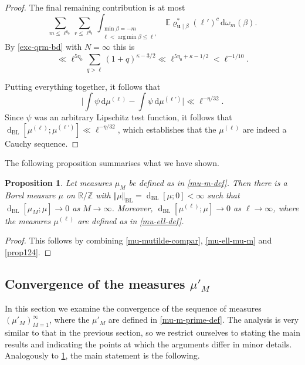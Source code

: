 \documentclass[11pt,reqno]{amsart}
\DeclareMathOperator*{\argmin}{arg\,min}
\numberwithin{equation}{section}
\newtheorem{proposition}[theorem]{Proposition}
\theoremstyle{definition}
\theoremstyle{remark}
\newcommand{\mb}{\mathbb}
\newcommand{\mbf}{\mathbf}
\newcommand{\dist}[2]{{\operatorname{d}_{\operatorname{BL}}[#1;#2]}}
\def\BL{\operatorname{BL}}
\renewcommand{\le}{\leqslant}
\newcommand\Z{\mathbb{Z}}
\newcommand\R{\mathbb{R}}
\begin{document}
\begin{proof}
The final remaining contribution is at most
\[ \sum_{m \le \ell^{\eta_0}} \sum_{r \le \ell^{\eta_0}} \int_{\substack{\min \beta = -m \\ \ell < \argmin \beta \le \ell'}} \mb{E} \varrho^*_{\mbf{u} \mid \beta}(\ell')^c \, \mathrm{d}\omega_{m} (\beta).\] By \cref{exc-qrm-bd} with $N = \infty$ this is
\[ \ll \ell^{5\eta_0} \sum_{q > \ell} (1 + q)^{\kappa - 3/2} \ll \ell^{5\eta_0 + \kappa - 1/2} < \ell^{-1/10}.\]


Putting everything together, it follows that 
\[ \big| \int \psi \, \mathrm{d}\mu^{(\ell)} - \int \psi \, \mathrm{d}\mu^{(\ell')} \big| \ll \ell^{-\eta/32}.\] Since $\psi$ was an arbitrary Lipschitz test function, it follows that $\dist{\mu^{(\ell)}}{\mu^{(\ell')}} \ll \ell^{-\eta/32}$, which establishes that the $\mu^{(\ell)}$ are indeed a Cauchy sequence.
\end{proof}

The following proposition summarises what we have shown. 

\begin{proposition}\label{main-mu-conv-prop} 
Let measures $\mu_M$ be defined as in \cref{mu-m-def}. Then there is a Borel measure $\mu$ on $\R/\Z$ with $\Vert \mu \Vert_{\BL} = \dist{\mu}{0} < \infty$ such that $\dist{\mu_M}{\mu} \rightarrow 0$ as $M \rightarrow \infty$. Moreover, $\dist{\mu^{(\ell)}}{\mu} \rightarrow 0$ as $\ell \rightarrow \infty$, where the measures $\mu^{(\ell)}$ are defined as in \cref{mu-ell-def}.
\end{proposition}
\begin{proof}
This follows by combining \cref{mu-mutilde-compar}, \cref{mu-ell-mu-m} and \cref{prop124}.
\end{proof}


\subsection{Convergence of the measures $\mu'_M$}
In this section we examine the convergence of the sequence of measures $(\mu'_M)_{M = 1}^{\infty}$, where the $\mu'_M$ are defined in \cref{mu-m-prime-def}. The analysis is very similar to that in the previous section, so we restrict ourselves to stating the main results and indicating the points at which the arguments differ in minor details. Analogously to \cref{main-mu-conv-prop}, the main statement is the following.
\end{document}
